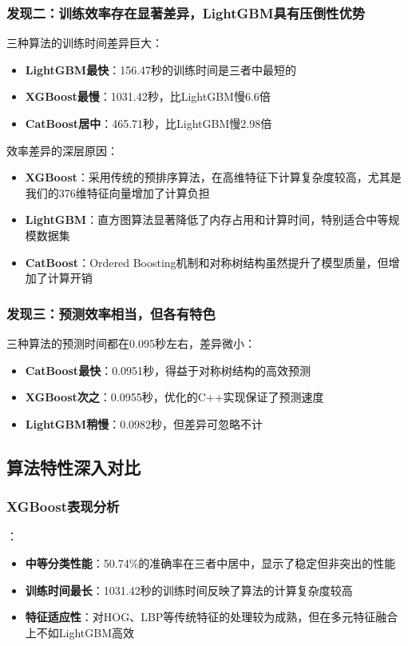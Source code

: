 \documentclass[UTF8]{report}
\theoremstyle{MyLineTheoremStyle} %
\theoremstyle{MyBlockTheoremStyle} %
\theoremstyle{MySubsubsectionStyle} %
\begin{document}
\subsubsection{发现二：训练效率存在显著差异，LightGBM具有压倒性优势}
三种算法的训练时间差异巨大：
\begin{itemize}
    \item \textbf{LightGBM最快}：156.47秒的训练时间是三者中最短的
    \item \textbf{XGBoost最慢}：1031.42秒，比LightGBM慢6.6倍
    \item \textbf{CatBoost居中}：465.71秒，比LightGBM慢2.98倍
\end{itemize}
效率差异的深层原因：
\begin{itemize}
    \item \textbf{XGBoost}：采用传统的预排序算法，在高维特征下计算复杂度较高，尤其是我们的376维特征向量增加了计算负担
    \item \textbf{LightGBM}：直方图算法显著降低了内存占用和计算时间，特别适合中等规模数据集
    \item \textbf{CatBoost}：Ordered Boosting机制和对称树结构虽然提升了模型质量，但增加了计算开销
\end{itemize}

\subsubsection{发现三：预测效率相当，但各有特色}
三种算法的预测时间都在0.095秒左右，差异微小：
\begin{itemize}
    \item \textbf{CatBoost最快}：0.0951秒，得益于对称树结构的高效预测
    \item \textbf{XGBoost次之}：0.0955秒，优化的C++实现保证了预测速度
    \item \textbf{LightGBM稍慢}：0.0982秒，但差异可忽略不计
\end{itemize}

\subsection{算法特性深入对比}
\subsubsection{XGBoost表现分析}：
\begin{itemize}
    \item \textbf{中等分类性能}：50.74\%的准确率在三者中居中，显示了稳定但非突出的性能
    \item \textbf{训练时间最长}：1031.42秒的训练时间反映了算法的计算复杂度较高
    \item \textbf{特征适应性}：对HOG、LBP等传统特征的处理较为成熟，但在多元特征融合上不如LightGBM高效
\end{itemize}
\end{document}
